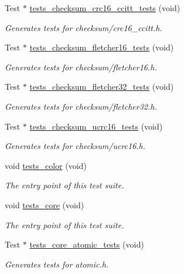 \begin{DoxyCompactItemize}
Test $\ast$ \hyperlink{group__unittests_gab14760f94862d361e37621a414849ac6}{tests\+\_\+checksum\+\_\+crc16\+\_\+ccitt\+\_\+tests} (void)
\begin{DoxyCompactList}\small\item\em Generates tests for checksum/crc16\+\_\+ccitt.\+h. \end{DoxyCompactList}\item 
Test $\ast$ \hyperlink{group__unittests_gae4f6cce052a84dde051799a5a57d9e44}{tests\+\_\+checksum\+\_\+fletcher16\+\_\+tests} (void)
\begin{DoxyCompactList}\small\item\em Generates tests for checksum/fletcher16.\+h. \end{DoxyCompactList}\item 
Test $\ast$ \hyperlink{group__unittests_gaa0b18302e117209cfda9e5cdc7cd5af8}{tests\+\_\+checksum\+\_\+fletcher32\+\_\+tests} (void)
\begin{DoxyCompactList}\small\item\em Generates tests for checksum/fletcher32.\+h. \end{DoxyCompactList}\item 
Test $\ast$ \hyperlink{group__unittests_gab30c0b0af5fcf4297ab2f8321a2838da}{tests\+\_\+checksum\+\_\+ucrc16\+\_\+tests} (void)
\begin{DoxyCompactList}\small\item\em Generates tests for checksum/ucrc16.\+h. \end{DoxyCompactList}\item 
void \hyperlink{group__unittests_ga211fe87abc68d3c2ef15a3db1dfbcb48}{tests\+\_\+color} (void)
\begin{DoxyCompactList}\small\item\em The entry point of this test suite. \end{DoxyCompactList}\item 
void \hyperlink{group__unittests_gaaaf35c94f5a45e12f3556bf2be09b022}{tests\+\_\+core} (void)
\begin{DoxyCompactList}\small\item\em The entry point of this test suite. \end{DoxyCompactList}\item 
Test $\ast$ \hyperlink{group__unittests_gadc7f89b561245603549db45a06d93cce}{tests\+\_\+core\+\_\+atomic\+\_\+tests} (void)
\begin{DoxyCompactList}\small\item\em Generates tests for atomic.\+h. \end{DoxyCompactList}\item 

\end{DoxyCompactItemize}
